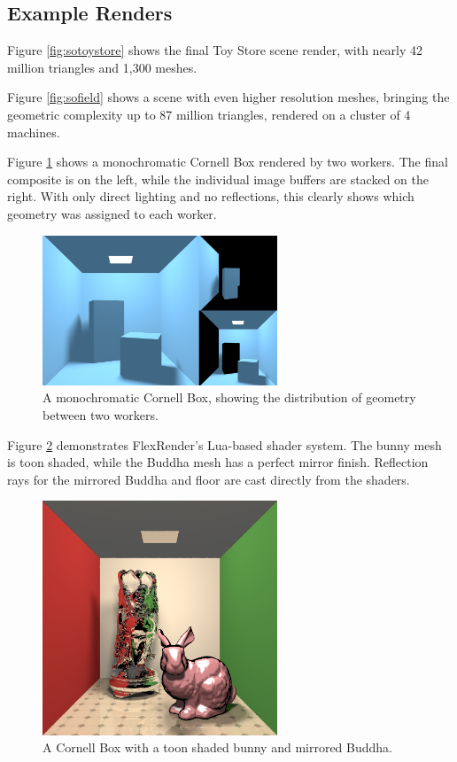 \documentclass[a4paper,twoside]{article}
\begin{document}
\subsection{Example Renders}
\label{examplerenders}

Figure \ref{fig:sotoystore} shows the final Toy Store scene render, with nearly
42 million triangles and 1,300 meshes.

Figure \ref{fig:sofield} shows a scene with even higher resolution meshes,
bringing the geometric complexity up to 87 million triangles, rendered on a
cluster of 4 machines.

Figure \ref{fig:sodist} shows a monochromatic Cornell Box rendered by two
workers. The final composite is on the left, while the individual image buffers
are stacked on the right. With only direct lighting and no reflections, this
clearly shows which geometry was assigned to each worker.

\begin{figure}[h!]
    \centering
    \includegraphics[width=70mm]{showoff/distribution.png}
    \caption{A monochromatic Cornell Box, showing the distribution of geometry between two workers.}
    \label{fig:sodist}
\end{figure}

Figure \ref{fig:socornell} demonstrates FlexRender's Lua-based shader system.
The bunny mesh is toon shaded, while the Buddha mesh has a perfect mirror
finish. Reflection rays for the mirrored Buddha and floor are cast directly
from the shaders.

\begin{figure}[h!]
    \centering
    \includegraphics[width=70mm]{showoff/cornell-models.png}
    \caption{A Cornell Box with a toon shaded bunny and mirrored Buddha.}
    \label{fig:socornell}
\end{figure}
\end{document}
